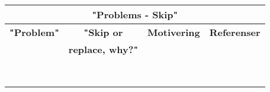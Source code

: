 \begin{table}[htbp]
\begin{center}
\begin{tabular}{|c|c|c|c|}
\hline
\multicolumn{4}{|c|}{\cellcolor{grey}\textbf{"Problems - Skip"}}\\
\hline \rowcolor{grey}
\textbf{"Problem"}                      & \textbf{"Skip or}        & \textbf{Motivering} & \textbf{Referenser} \\
\rowcolor{grey}                         & \textbf{replace, why?"}  &                     &  \\
\hline
                                        &                          &                     & \\
                                        &                          &                     & \\
\hline
                                        &                          &                     & \\
                                        &                          &                     & \\
\hline
                                        &                          &                     & \\
\hline
                                        &                          &                     & \\
\hline
                                        &                          &                     & \\
\hline
                                        &                          &                     & \\
\hline
\end{tabular}
\label{tab1}
\end{center}
\end{table}